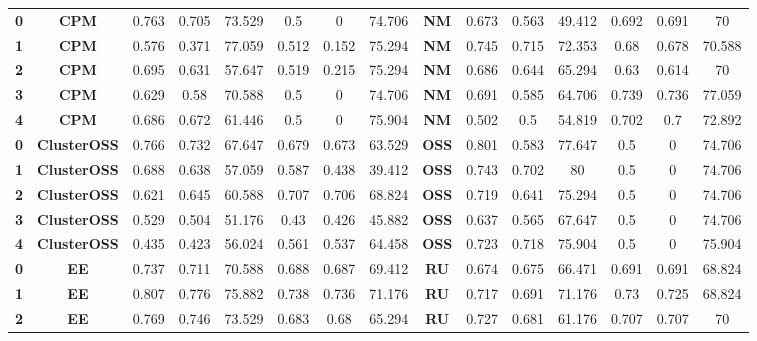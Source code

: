 {{\begin{tabular}{c|c|cccccc|ccccccc}
\textbf{0} & \textbf{CPM} & 0.763 & 0.705 & 73.529 & 0.5   & 0     & 74.706 & \multicolumn{1}{c|}{\textbf{NM}} & 0.673 & 0.563 & 49.412 & 0.692 & 0.691 & 70 \\
\textbf{1} & \textbf{CPM} & 0.576 & 0.371 & 77.059 & 0.512 & 0.152 & 75.294 & \multicolumn{1}{c|}{\textbf{NM}} & 0.745 & 0.715 & 72.353 & 0.68  & 0.678 & 70.588 \\
\textbf{2} & \textbf{CPM} & 0.695 & 0.631 & 57.647 & 0.519 & 0.215 & 75.294 & \multicolumn{1}{c|}{\textbf{NM}} & 0.686 & 0.644 & 65.294 & 0.63  & 0.614 & 70 \\
\textbf{3} & \textbf{CPM} & 0.629 & 0.58  & 70.588 & 0.5   & 0     & 74.706 & \multicolumn{1}{c|}{\textbf{NM}} & 0.691 & 0.585 & 64.706 & 0.739 & 0.736 & 77.059 \\
\textbf{4} & \textbf{CPM} & 0.686 & 0.672 & 61.446 & 0.5   & 0     & 75.904 & \multicolumn{1}{c|}{\textbf{NM}} & 0.502 & 0.5   & 54.819 & 0.702 & 0.7   & 72.892 \\
\textbf{0} & \textbf{ClusterOSS} & 0.766 & 0.732 & 67.647 & 0.679 & 0.673 & 63.529 & \multicolumn{1}{c|}{\textbf{OSS}} & 0.801 & 0.583 & 77.647 & 0.5   & 0     & 74.706 \\
\textbf{1} & \textbf{ClusterOSS} & 0.688 & 0.638 & 57.059 & 0.587 & 0.438 & 39.412 & \multicolumn{1}{c|}{\textbf{OSS}} & 0.743 & 0.702 & 80    & 0.5   & 0     & 74.706 \\
\textbf{2} & \textbf{ClusterOSS} & 0.621 & 0.645 & 60.588 & 0.707 & 0.706 & 68.824 & \multicolumn{1}{c|}{\textbf{OSS}} & 0.719 & 0.641 & 75.294 & 0.5   & 0     & 74.706 \\
\textbf{3} & \textbf{ClusterOSS} & 0.529 & 0.504 & 51.176 & 0.43  & 0.426 & 45.882 & \multicolumn{1}{c|}{\textbf{OSS}} & 0.637 & 0.565 & 67.647 & 0.5   & 0     & 74.706 \\
\textbf{4} & \textbf{ClusterOSS} & 0.435 & 0.423 & 56.024 & 0.561 & 0.537 & 64.458 & \multicolumn{1}{c|}{\textbf{OSS}} & 0.723 & 0.718 & 75.904 & 0.5   & 0     & 75.904 \\
\textbf{0} & \textbf{EE} & 0.737 & 0.711 & 70.588 & 0.688 & 0.687 & 69.412 & \multicolumn{1}{c|}{\textbf{RU}} & 0.674 & 0.675 & 66.471 & 0.691 & 0.691 & 68.824 \\
\textbf{1} & \textbf{EE} & 0.807 & 0.776 & 75.882 & 0.738 & 0.736 & 71.176 & \multicolumn{1}{c|}{\textbf{RU}} & 0.717 & 0.691 & 71.176 & 0.73  & 0.725 & 68.824 \\
\textbf{2} & \textbf{EE} & 0.769 & 0.746 & 73.529 & 0.683 & 0.68  & 65.294 & \multicolumn{1}{c|}{\textbf{RU}} & 0.727 & 0.681 & 61.176 & 0.707 & 0.707 & 70 \\

\end{tabular}}}
